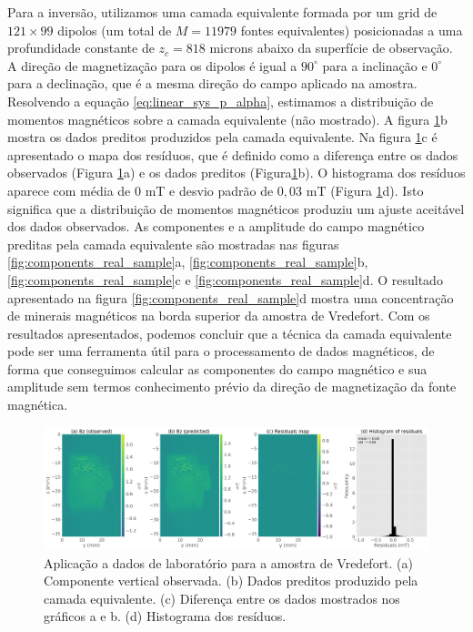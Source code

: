 Para a inversão, utilizamos uma camada equivalente formada por um grid de $121 \times 99$ dipolos (um total de $M=11979$ fontes equivalentes) posicionadas a uma profundidade constante de $z_c = 818$ microns abaixo da superfície de observação. A direção de magnetização para os dipolos é igual a $90^\circ$ para a inclinação e $0^\circ$ para a declinação, que é a mesma direção do campo aplicado na amostra. Resolvendo a equação \ref{eq:linear_sys_p_alpha}, estimamos a distribuição de momentos magnéticos sobre a camada equivalente (não mostrado). A figura \ref{fig:datafit_real_sample}b mostra os dados preditos produzidos pela camada equivalente. Na figura \ref{fig:datafit_real_sample}c é apresentado o mapa dos resíduos, que é definido como a diferença entre os dados observados (Figura \ref{fig:datafit_real_sample}a) e os dados preditos (Figura\ref{fig:datafit_real_sample}b). O histograma dos resíduos aparece com média de $0$ mT e desvio padrão de $0,03$ mT (Figura \ref{fig:datafit_real_sample}d). Isto significa que a distribuição de momentos magnéticos produziu um ajuste aceitável dos dados observados. As componentes e a amplitude do campo magnético preditas pela camada equivalente são mostradas nas figuras \ref{fig:components_real_sample}a, \ref{fig:components_real_sample}b, \ref{fig:components_real_sample}c e \ref{fig:components_real_sample}d. O resultado apresentado na figura \ref{fig:components_real_sample}d mostra uma concentração de minerais magnéticos na borda superior da amostra de Vredefort. Com os resultados apresentados, podemos concluir que a técnica da camada equivalente pode ser uma ferramenta útil para o processamento de dados magnéticos, de forma que conseguimos calcular as componentes do campo magnético e sua amplitude sem termos conhecimento prévio da direção de magnetização da fonte magnética. 

\begin{figure}
	\centering
	\includegraphics[width=.9\textwidth]{Fig/mag_vec/aplicacao_vredefort/results_data_fitting_Bz.png}
	\caption{Aplicação a dados de laboratório para a amostra de Vredefort. (a) Componente vertical observada. (b) Dados preditos produzido pela camada equivalente. (c) Diferença entre os dados mostrados nos gráficos a e b. (d) Histograma dos resíduos.}
	\label{fig:datafit_real_sample}
\end{figure}


